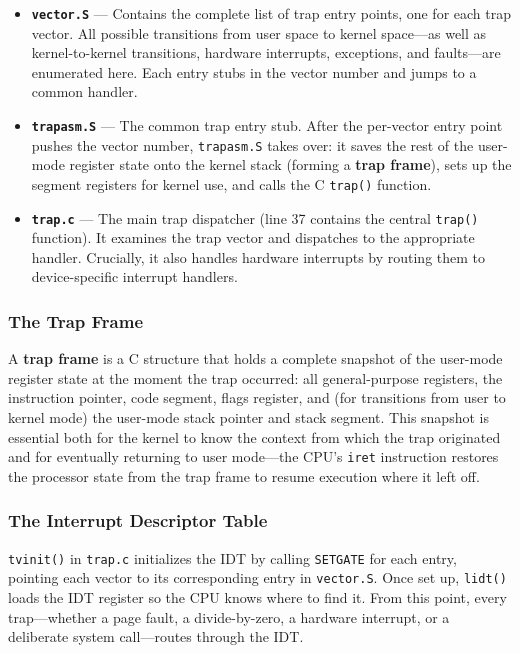 \documentclass[11pt]{article}
\begin{document}
\begin{itemize}
    \item \textbf{\texttt{vector.S}} --- Contains the complete list of trap entry points, one for each trap vector. All possible transitions from user space to kernel space---as well as kernel-to-kernel transitions, hardware interrupts, exceptions, and faults---are enumerated here. Each entry stubs in the vector number and jumps to a common handler.
    \item \textbf{\texttt{trapasm.S}} --- The common trap entry stub. After the per-vector entry point pushes the vector number, \texttt{trapasm.S} takes over: it saves the rest of the user-mode register state onto the kernel stack (forming a \textbf{trap frame}), sets up the segment registers for kernel use, and calls the C \texttt{trap()} function.
    \item \textbf{\texttt{trap.c}} --- The main trap dispatcher (line 37 contains the central \texttt{trap()} function). It examines the trap vector and dispatches to the appropriate handler. Crucially, it also handles hardware interrupts by routing them to device-specific interrupt handlers.
\end{itemize}

\subsubsection*{The Trap Frame}

A \textbf{trap frame} is a C structure that holds a complete snapshot of the user-mode register state at the moment the trap occurred: all general-purpose registers, the instruction pointer, code segment, flags register, and (for transitions from user to kernel mode) the user-mode stack pointer and stack segment. This snapshot is essential both for the kernel to know the context from which the trap originated and for eventually returning to user mode---the CPU's \texttt{iret} instruction restores the processor state from the trap frame to resume execution where it left off.

\subsubsection*{The Interrupt Descriptor Table}

\texttt{tvinit()} in \texttt{trap.c} initializes the IDT by calling \texttt{SETGATE} for each entry, pointing each vector to its corresponding entry in \texttt{vector.S}. Once set up, \texttt{lidt()} loads the IDT register so the CPU knows where to find it. From this point, every trap---whether a page fault, a divide-by-zero, a hardware interrupt, or a deliberate system call---routes through the IDT.
\end{document}
